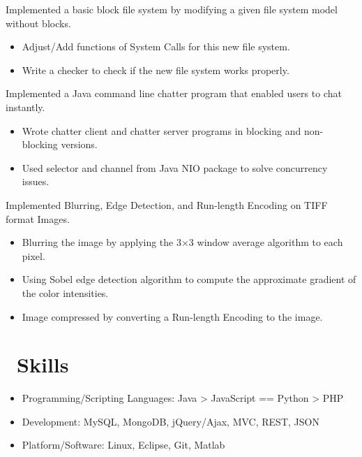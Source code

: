 \documentclass{resume}
\begin{document}

Implemented a basic block file system by modifying a given file system model without blocks.
\begin{itemize}
  \item Adjust/Add functions of System Calls for this new file system.
  \item Write a checker to check if the new file system works properly.
\end{itemize}

Implemented a Java command line chatter program that enabled users to chat instantly.
\begin{itemize}
  \item Wrote chatter client and chatter server programs in blocking and non-blocking versions.
  \item Used selector and channel from Java NIO package to solve concurrency issues.
\end{itemize}

Implemented Blurring, Edge Detection, and Run-length Encoding on TIFF format Images.
\begin{itemize}
  \item Blurring the image by applying the 3×3 window average algorithm to each pixel.
  \item Using Sobel edge detection algorithm to compute the approximate gradient of the color intensities.
  \item Image compressed by converting a Run-length Encoding to the image.
\end{itemize}

\section{\faCog\ Skills}
\begin{itemize}[parsep=0.5ex]
  \item Programming/Scripting Languages: Java > JavaScript == Python > PHP
  \item Development: MySQL, MongoDB, jQuery/Ajax, MVC, REST, JSON
  \item Platform/Software: Linux, Eclipse, Git, Matlab
\end{itemize}
\end{document}
